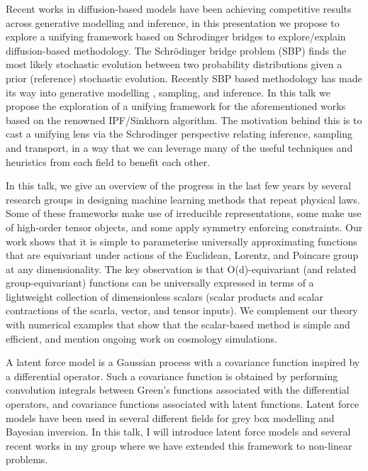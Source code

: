 \documentclass[a4paper,UKenglish]{dagrep-v2021}
\begin{document}
Recent works in diffusion-based models have been achieving competitive results across generative modelling and inference, in this presentation we propose to explore a unifying framework based on Schrodinger bridges to explore/explain diffusion-based methodology. The Schrödinger bridge problem (SBP) finds the most likely stochastic evolution between two probability distributions given a prior (reference) stochastic evolution. Recently SBP based methodology has made its way into generative modelling , sampling, and inference. In this talk we propose the exploration of a unifying framework for the aforementioned works based on the renowned IPF/Sinkhorn algorithm. The motivation behind this is to cast a unifying lens via the Schrodinger perspective relating inference, sampling and transport, in a way that we can leverage many of the useful techniques and heuristics from each field to benefit each other.

\license

In this talk, we give an overview of the progress in the last few years by several research groups in designing machine learning methods that repeat physical laws. Some of these frameworks make use of irreducible representations, some make use of high-order tensor objects, and some apply symmetry enforcing constraints. Our work shows that it is simple to parameterise universally approximating functions that are equivariant under actions of the Euclidean, Lorentz, and Poincare group at any dimensionality. The key observation is that O(d)-equivariant (and related group-equivariant) functions can be universally expressed in terms of a lightweight collection of dimensionless scalars (scalar products and scalar contractions of the scarla, vector, and tensor inputs). We complement our theory with numerical examples that show that the scalar-based method is simple and efficient, and mention ongoing work on cosmology simulations.

\license

A latent force model is a Gaussian process with a covariance function inspired by a differential operator. Such a covariance function is obtained by performing convolution integrals between Green's functions associated with the differential operators, and covariance functions associated with latent functions. Latent force models have been used in several different fields for grey box modelling and Bayesian inversion. In this talk, I will introduce latent force models and several recent works in my group where we have extended this framework to non-linear problems.
\end{document}
